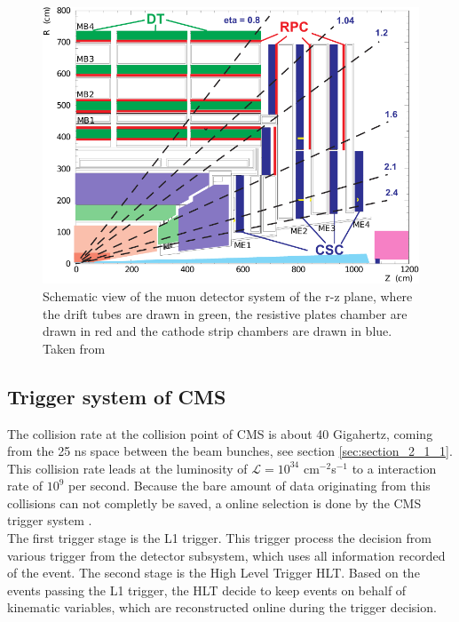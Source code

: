 \begin{figure}[ht]
	\centering
	\includegraphics[width=1\textwidth]{pictures/MUON_SYSTEM.pdf}

	\caption[Muon detector system of CMS]{Schematic view of the muon detector system of the r-z plane, where the drift tubes are drawn in green, the resistive plates chamber are drawn in red and the cathode strip chambers are drawn in blue. Taken from \cite{CMS2}}
	\label{fig:fig_2_10}
\end{figure}


\subsection{Trigger system of \gls{CMS}}

The collision rate at the collision point of \gls{CMS} is about 40 Gigahertz, coming from the 25 ns space between the beam bunches, see section \ref{sec:section_2_1_1}. This collision rate leads at the luminosity of $\mathcal{L} = 10^{34}$ cm$^{-2}$s$^{-1}$ to a interaction rate of $10^9$ per second. Because the bare amount of data originating from this collisions can not completly be saved, a online selection is done by the \gls{CMS} trigger system \cite{CMS2, TRIGGER}. \\

The first trigger stage is the L1 trigger. This trigger process the decision from various trigger from the detector subsystem, which uses all information recorded of the event. The second stage is the High Level Trigger \gls{HLT}. Based on the events passing the L1 trigger, the \gls{HLT} decide to keep events on behalf of kinematic variables, which are reconstructed online during the trigger decision. 

